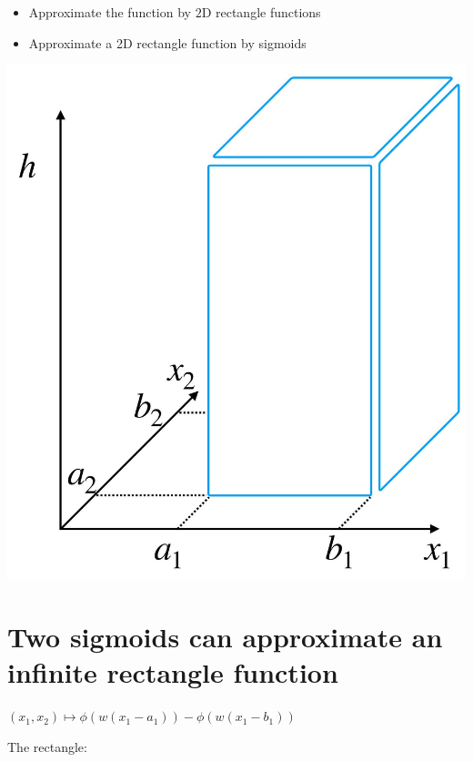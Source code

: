 \documentclass[10pt]{article}
\begin{document}
\begin{itemize}
  \item Approximate the function by $2 \mathrm{D}$ rectangle functions
  \item Approximate a 2D rectangle function by sigmoids
\end{itemize}

\begin{center}
\includegraphics[max width=\textwidth]{2024_01_08_0e0dcffe4bc8c6049046g-27}
\end{center}

\section*{Two sigmoids can approximate an infinite rectangle function}
$\left(x_{1}, x_{2}\right) \mapsto \phi\left(w\left(x_{1}-a_{1}\right)\right)-\phi\left(w\left(x_{1}-b_{1}\right)\right)$

The rectangle:
\end{document}
